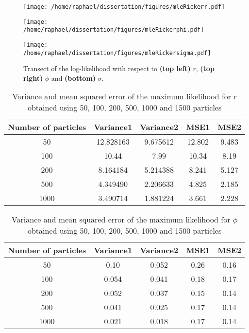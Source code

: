 \documentclass{article}
\newcommand{\ra}[1]{\renewcommand{\arraystretch}{#1}}
\begin{document}
	\begin{figure}[htb]
		\centering
		\begin{minipage}{0.4\textwidth}
			\centering
			\texttt{[image: /home/raphael/dissertation/figures/mleRickerr.pdf]}
		\end{minipage}
		\begin{minipage}{0.4\textwidth}
			\centering
			\texttt{[image: /home/raphael/dissertation/figures/mleRickerphi.pdf]}
		\end{minipage}
		\begin{minipage}{0.4\textwidth}
			\centering
			\texttt{[image: /home/raphael/dissertation/figures/mleRickersigma.pdf]}
		\end{minipage}
		\caption{Transect of the log-likelihood with respect to \textbf{(top left)} $r$, \textbf{(top right)} $\phi$ and \textbf{(bottom)} $\sigma$.}
		\label{fig:transect}
	\end{figure}
	
	\begin{table}[htb]
		\centering
		\ra{1.3}
		\begin{tabular}{@{}ccccc@{}} \toprule
			Number of particles & Variance1 &  Variance2 & MSE1 & MSE2 \\ \midrule
			50 & 12.828163 &  9.675612 & 12.802 & 9.483\\ 
			100 & 10.44 & 7.99 & 10.34 & 8.19\\ 
			200 & 8.164184 & 5.214388 &  8.241 & 5.127\\ 
			500 & 4.349490 & 2.206633 & 4.825 & 2.185\\ 
			1000 & 3.490714 & 1.881224 & 3.661  & 2.228\\  \bottomrule
		\end{tabular}
		\caption{Variance and mean squared error of the maximum likelihood for r obtained using 50, 100, 200, 500, 1000 and 1500 particles}
		\label{table:mleR}
	\end{table}

	\begin{table}[htb]
		\centering
		\ra{1.3}
		\begin{tabular}{@{}ccccc@{}} \toprule
			Number of particles & Variance1 &  Variance2 & MSE1 & MSE2 \\ \midrule
			50 & 0.10 & 0.052 & 0.26 & 0.16\\
			100 & 0.054 & 0.041 & 0.18 & 0.17\\ 
			200 & 0.052 & 0.037 & 0.15 & 0.14\\ 
			500 & 0.041 & 0.025 & 0.17 & 0.14\\
			1000 & 0.021 & 0.018 & 0.17 & 0.14 \\ \bottomrule
		\end{tabular}
		\caption{Variance and mean squared error of the maximum likelihood for $\phi$ obtained using 50, 100, 200, 500, 1000 and 1500 particles}
		\label{table:mlePhi}
	\end{table}
\end{document}
